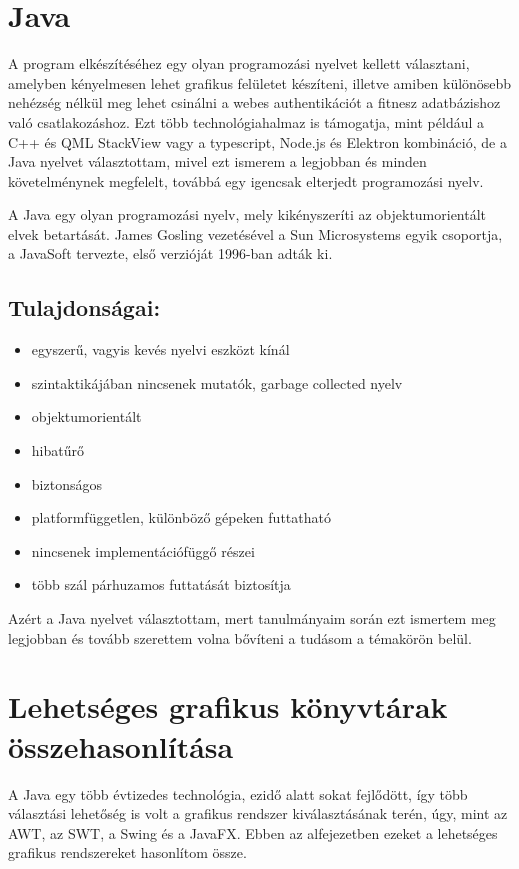 
\section{Java}

A program elkészítéséhez egy olyan programozási nyelvet kellett választani, amelyben kényelmesen lehet grafikus felületet készíteni, illetve amiben különösebb nehézség nélkül meg lehet csinálni a webes authentikációt a fitnesz adatbázishoz való csatlakozáshoz. Ezt több technológiahalmaz is támogatja, mint például a C++ és QML StackView vagy a typescript, Node.js és Elektron kombináció, de a Java nyelvet választottam, mivel ezt ismerem a legjobban és minden követelménynek megfelelt, továbbá egy igencsak elterjedt programozási nyelv.

A Java egy olyan programozási nyelv, mely kikényszeríti az objektumorientált elvek betartását. James Gosling vezetésével a Sun Microsystems egyik csoportja, a JavaSoft tervezte, első verzióját 1996-ban adták ki.

\subsection*{Tulajdonságai:}
\begin{itemize}
\item egyszerű, vagyis kevés nyelvi eszközt kínál
\item szintaktikájában nincsenek mutatók, garbage collected nyelv
\item objektumorientált
\item hibatűrő
\item biztonságos
\item platformfüggetlen, különböző gépeken futtatható
\item nincsenek implementációfüggő részei
\item több szál párhuzamos futtatását biztosítja
\end{itemize}

Azért a Java nyelvet választottam, mert tanulmányaim során ezt ismertem meg legjobban és tovább szerettem volna bővíteni a tudásom a témakörön belül.

\section{Lehetséges grafikus könyvtárak összehasonlítása}

A Java egy több évtizedes technológia, ezidő alatt sokat fejlődött, így több választási lehetőség is volt a grafikus rendszer kiválasztásának terén, úgy, mint az AWT, az SWT, a Swing és a JavaFX. Ebben az alfejezetben ezeket a lehetséges grafikus rendszereket hasonlítom össze. 

